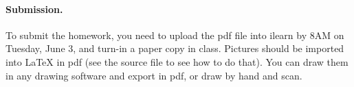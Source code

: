 


\vskip 0.1in
\paragraph{Submission.}
To submit the homework, you need to upload the pdf file into ilearn by 8AM on Tuesday, June 3,
and turn-in a paper copy in class.
Pictures should be 
imported into {\LaTeX} in pdf (see the source file to see
how to do that). You can draw them in any drawing
software and export in pdf, or draw by hand and scan.



